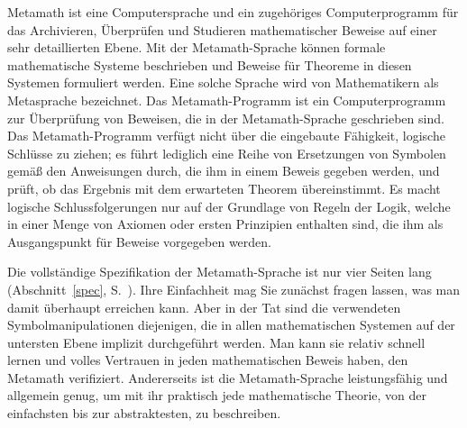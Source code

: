 Metamath ist eine Computersprache und ein zugehöriges Computerprogramm für das Archivieren, Überprüfen und Studieren mathematischer Beweise auf einer sehr detaillierten Ebene.
Mit der Metamath-Sprache können formale mathematische Systeme beschrieben und Beweise für Theoreme in diesen Systemen formuliert werden.  Eine solche Sprache wird von Mathematikern als Metasprache bezeichnet. Das Metamath-Programm ist ein Computerprogramm zur Überprüfung von Beweisen, die in der Metamath-Sprache geschrieben sind.  Das Metamath-Programm verfügt nicht über die eingebaute Fähigkeit, logische Schlüsse zu ziehen; es führt lediglich eine Reihe von Ersetzungen von Symbolen gemäß den Anweisungen durch, die ihm in einem Beweis gegeben werden, und prüft, ob das Ergebnis mit dem erwarteten Theorem übereinstimmt.  Es macht logische  Schlussfolgerungen nur auf der Grundlage von Regeln der Logik, welche in einer Menge von Axiomen oder ersten Prinzipien enthalten sind, die ihm als Ausgangspunkt für Beweise vorgegeben werden.

Die vollständige Spezifikation der Metamath-Sprache ist nur vier Seiten lang (Abschnitt~\ref{spec}, S.~\pageref{spec}).  Ihre Einfachheit mag Sie zunächst fragen lassen, was man damit überhaupt erreichen kann.  Aber in der Tat sind die verwendeten Symbolmanipulationen diejenigen, die in allen mathematischen Systemen auf der untersten Ebene implizit durchgeführt werden.  Man kann sie relativ schnell lernen und volles Vertrauen in jeden mathematischen Beweis haben, den Metamath verifiziert.  Andererseits ist die Metamath-Sprache leistungsfähig und allgemein genug, um mit ihr  praktisch jede mathematische Theorie, von der einfachsten bis zur abstraktesten, zu beschreiben.

